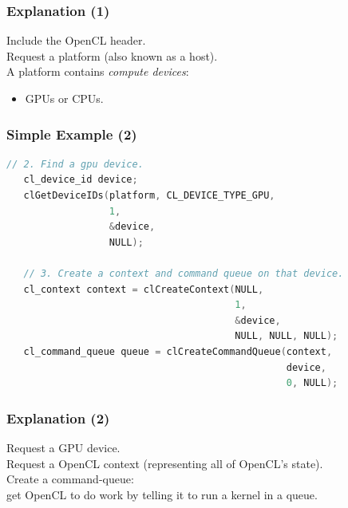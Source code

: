 \begin{frame}
  \frametitle{Explanation (1)}


    Include the OpenCL header.\\[1em]

    Request a platform (also known as a host).\\[1em]

    A platform contains {\it compute devices}:
      \begin{itemize}
        \item GPUs or CPUs.
      \end{itemize}

\end{frame}

\begin{frame}[fragile]
  \frametitle{Simple Example (2)}



  \begin{lstlisting}[language=C]
   // 2. Find a gpu device.
   cl_device_id device;
   clGetDeviceIDs(platform, CL_DEVICE_TYPE_GPU,
                  1,
                  &device,
                  NULL);

   // 3. Create a context and command queue on that device.
   cl_context context = clCreateContext(NULL,
                                        1,
                                        &device,
                                        NULL, NULL, NULL);
   cl_command_queue queue = clCreateCommandQueue(context,
                                                 device,
                                                 0, NULL);
  \end{lstlisting}

\end{frame}

\begin{frame}
  \frametitle{Explanation (2)}


    Request a GPU device.\\[1em]

    Request a OpenCL context (representing all of OpenCL's state).\\[1em]

    Create a command-queue: \\
 get OpenCL to do work by telling it to run
      a kernel in a queue.

\end{frame}

